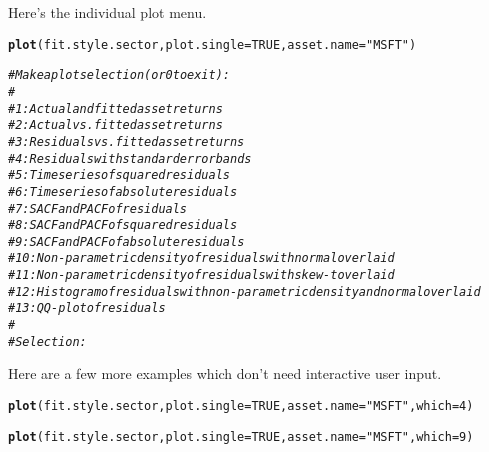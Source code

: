 \documentclass[a4paper]{article}\usepackage[]{graphicx}\usepackage[]{color}
\makeatletter
\newcommand{\hlnum}[1]{\textcolor[rgb]{0.686,0.059,0.569}{#1}}%
\newcommand{\hlstr}[1]{\textcolor[rgb]{0.192,0.494,0.8}{#1}}%
\newcommand{\hlcom}[1]{\textcolor[rgb]{0.678,0.584,0.686}{\textit{#1}}}%
\newcommand{\hlstd}[1]{\textcolor[rgb]{0.345,0.345,0.345}{#1}}%
\newcommand{\hlkwc}[1]{\textcolor[rgb]{0.333,0.667,0.333}{#1}}%
\newcommand{\hlkwd}[1]{\textcolor[rgb]{0.737,0.353,0.396}{\textbf{#1}}}%
\newenvironment{kframe}{%
 \def\at@end@of@kframe{}%
 \ifinner\ifhmode%
  \def\at@end@of@kframe{\end{minipage}}%
  \begin{minipage}{\columnwidth}%
 \fi\fi%
 \def\FrameCommand##1{\hskip\@totalleftmargin \hskip-\fboxsep
 \colorbox{shadecolor}{##1}\hskip-\fboxsep
     \hskip-\linewidth \hskip-\@totalleftmargin \hskip\columnwidth}%
 \MakeFramed {\advance\hsize-\width
   \@totalleftmargin\z@ \linewidth\hsize
   \@setminipage}}%
 {\par\unskip\endMakeFramed%
 \at@end@of@kframe}
\newenvironment{knitrout}{}{} %
\makeatother
\begin{document}
Here's the individual plot menu.
\begin{knitrout}
\color{fgcolor}\begin{kframe}
\begin{alltt}
\hlkwd{plot}\hlstd{(fit.style.sector,} \hlkwc{plot.single}\hlstd{=}\hlnum{TRUE}\hlstd{,} \hlkwc{asset.name}\hlstd{=}\hlstr{"MSFT"}\hlstd{)}

\hlcom{# Make a plot selection (or 0 to exit):}
\hlcom{#}
\hlcom{#  1: Actual and fitted asset returns}
\hlcom{#  2: Actual vs. fitted asset returns}
\hlcom{#  3: Residuals vs. fitted asset returns}
\hlcom{#  4: Residuals with standard error bands}
\hlcom{#  5: Time series of squared residuals}
\hlcom{#  6: Time series of absolute residuals}
\hlcom{#  7: SACF and PACF of residuals}
\hlcom{#  8: SACF and PACF of squared residuals}
\hlcom{#  9: SACF and PACF of absolute residuals}
\hlcom{# 10: Non-parametric density of residuals with normal overlaid}
\hlcom{# 11: Non-parametric density of residuals with skew-t overlaid}
\hlcom{# 12: Histogram of residuals with non-parametric density and normal overlaid}
\hlcom{# 13: QQ-plot of residuals}
\hlcom{#}
\hlcom{# Selection:}
\end{alltt}
\end{kframe}
\end{knitrout}

Here are a few more examples which don't need interactive user input.
\begin{knitrout}
\color{fgcolor}\begin{kframe}
\begin{alltt}
\hlkwd{plot}\hlstd{(fit.style.sector,} \hlkwc{plot.single}\hlstd{=}\hlnum{TRUE}\hlstd{,} \hlkwc{asset.name}\hlstd{=}\hlstr{"MSFT"}\hlstd{,} \hlkwc{which}\hlstd{=}\hlnum{4}\hlstd{)}
\end{alltt}


{\ttfamily\noindent\bfseries\color{errorcolor}{\#\# Error in xy.coords(x, y, xlabel, ylabel, log): 'x' is a list, but does not have components 'x' and 'y'}}\end{kframe}
\end{knitrout}

\begin{knitrout}
\color{fgcolor}\begin{kframe}
\begin{alltt}
\hlkwd{plot}\hlstd{(fit.style.sector,} \hlkwc{plot.single}\hlstd{=}\hlnum{TRUE}\hlstd{,} \hlkwc{asset.name}\hlstd{=}\hlstr{"MSFT"}\hlstd{,} \hlkwc{which}\hlstd{=}\hlnum{9}\hlstd{)}
\end{alltt}


{\ttfamily\noindent\bfseries\color{errorcolor}{\#\# Error in xy.coords(x, y, xlabel, ylabel, log): 'x' is a list, but does not have components 'x' and 'y'}}\end{kframe}
\end{knitrout}
\end{document}
